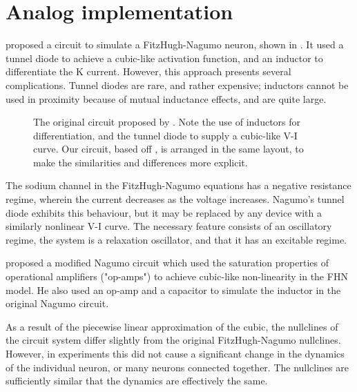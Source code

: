 \documentclass[
    11pt,
]{article}
\begin{document}

\section{Analog implementation}

\citet{nagumo1962} proposed a circuit to simulate a FitzHugh-Nagumo neuron, shown in .  It used a tunnel diode to achieve a cubic-like activation function, and an inductor to differentiate the K current.  However, this approach presents several complications.  Tunnel diodes are rare, and rather expensive; inductors cannot be used in proximity because of mutual inductance effects, and are quite large.

\begin{figure}[h!]
    \centering
    \caption{The original circuit proposed by \citet{nagumo1962}.  Note the use of inductors for differentiation, and the tunnel diode to supply a cubic-like V-I curve.  Our circuit, based off \citet{keener1983}, is arranged in the same layout, to make the similarities and differences more explicit.}
    \label{fig: nagumo_ckt}
\end{figure}


The sodium channel in the FitzHugh-Nagumo equations has a negative resistance regime, wherein the current decreases as the voltage increases.  Nagumo's tunnel diode exhibits this behaviour, but it may be replaced by any device with a similarly nonlinear V-I curve.  The necessary feature consists of an oscillatory regime, the system is a relaxation oscillator, and that it has an excitable regime.

\citet{keener1983} proposed a modified Nagumo circuit which used the saturation properties of operational amplifiers ("op-amps") to achieve cubic-like non-linearity in the FHN model. He also used an op-amp and a capacitor to simulate the inductor in the original Nagumo circuit.

As a result of the piecewise linear approximation of the cubic, the nullclines of the circuit system differ slightly from the original FitzHugh-Nagumo nullclines.  However, in experiments this did not cause a significant change in the dynamics of the individual neuron, or many neurons connected together.  The nullclines are sufficiently similar that the dynamics are effectively the same.
\end{document}
